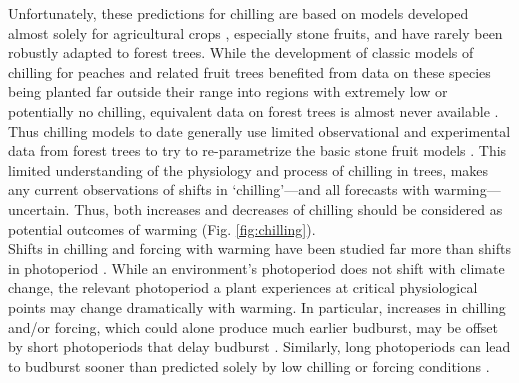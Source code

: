 \documentclass[11pt,letter]{article}
\begin{document}
Unfortunately, these predictions for chilling are based on models developed almost solely for agricultural crops \citep[but see][]{harrington2015}, especially stone fruits, and have rarely been robustly adapted to forest trees. While the development of classic models of chilling for peaches and related fruit trees benefited from data on these species being planted far outside their range into regions with extremely low or potentially no chilling, equivalent data on forest trees is almost never available \citep{dennis2003}. Thus chilling models to date generally use limited observational and experimental data from forest trees to try to re-parametrize the basic stone fruit models \citep{Chuine2000,chuine2016}. This limited understanding of the physiology and process of chilling in trees, makes any current observations of shifts in `chilling'---and all forecasts with warming---uncertain. Thus, both increases and decreases of chilling should be considered as potential outcomes of warming (Fig. \ref{fig:chilling}). \\

Shifts in chilling and forcing with warming have been studied far more than shifts in photoperiod \citep[but see][]{saikkonen2012,way2015}. While an environment's photoperiod does not shift with climate change, the relevant photoperiod a plant experiences at critical physiological points may change dramatically with warming. In particular, increases in chilling and/or forcing, which could alone produce much earlier budburst, may be offset by short photoperiods that delay budburst \citep{gauzere2019}. Similarly, long photoperiods can lead to budburst sooner than predicted solely by low chilling or forcing conditions \citep{Nienstaedt:1966aa,Myking:1995,Partanen:1998aa}.\\
\end{document}
